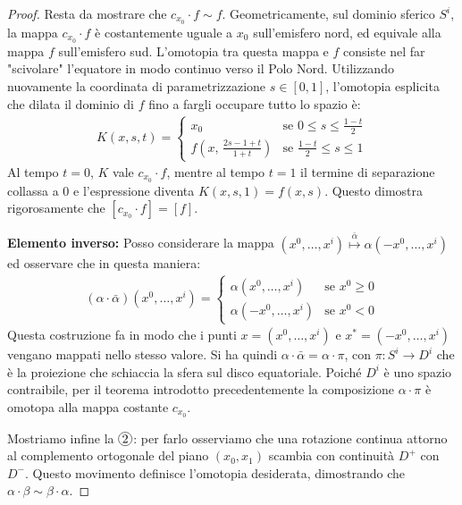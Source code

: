 \begin{proof}
    Resta da mostrare che $c_{x_0} \cdot f \sim f$. Geometricamente, sul dominio sferico $S^i$, la mappa $c_{x_0} \cdot f$ è costantemente uguale a $x_0$ sull'emisfero nord, ed equivale alla mappa $f$ sull'emisfero sud. L'omotopia tra questa mappa e $f$ consiste nel far "scivolare" l'equatore in modo continuo verso il Polo Nord. Utilizzando nuovamente la coordinata di parametrizzazione $s \in [0,1]$, l'omotopia esplicita che dilata il dominio di $f$ fino a fargli occupare tutto lo spazio è:
    \begin{align}
        K(x, s, t) = \begin{cases}
            x_0 & \text{se } 0 \leq s \leq \frac{1-t}{2} \\[6pt]
            f\left(x, \, \frac{2s - 1 + t}{1+t}\right) & \text{se } \frac{1-t}{2} \leq s \leq 1
        \end{cases}
    \end{align}
    Al tempo $t=0$, $K$ vale $c_{x_0} \cdot f$, mentre al tempo $t=1$ il termine di separazione collassa a $0$ e l'espressione diventa $K(x, s, 1) = f(x, s)$. Questo dimostra rigorosamente che $[c_{x_0} \cdot f] = [f]$.

    \textbf{Elemento inverso:} Posso considerare la mappa $(x^0, \ldots, x^i) \stackrel{\bar{\alpha}}{\mapsto} \alpha(-x^0, \ldots, x^i)$ ed osservare che in questa maniera:
    \begin{align}
        (\alpha \cdot \bar{\alpha})(x^0, \ldots, x^i) = \begin{cases}
            \alpha(x^0, \ldots, x^i) & \text{se } x^0 \geq 0 \\
            \alpha(-x^0, \ldots, x^i) & \text{se } x^0 < 0
        \end{cases}
    \end{align}
    Questa costruzione fa in modo che i punti $x = (x^0, \ldots, x^i)$ e $x^* = (-x^0, \ldots, x^i)$ vengano mappati nello stesso valore. Si ha quindi $\alpha \cdot \bar{\alpha} = \alpha \cdot \pi$, con $\pi: S^i \to D^i$ che è la proiezione che schiaccia la sfera sul disco equatoriale. Poiché $D^i$ è uno spazio contraibile, per il teorema introdotto precedentemente la composizione $\alpha \cdot \pi$ è omotopa alla mappa costante $c_{x_0}$. \newline

    Mostriamo infine la $\circled{2}$: per farlo osserviamo che una rotazione continua attorno al complemento ortogonale del piano $(x_0, x_1)$ scambia con continuità $D^+$ con $D^-$. Questo movimento definisce l'omotopia desiderata, dimostrando che $\alpha \cdot \beta \sim \beta \cdot \alpha$.
\end{proof}

